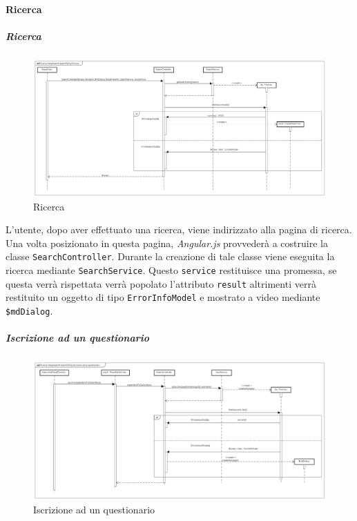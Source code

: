 \paragraph{Ricerca}

\subparagraph{Ricerca}

\label{Ricerca}

\begin{figure}[ht]
	\centering
	\includegraphics[scale=0.275,keepaspectratio]{UML/DiagrammiDiSequenza/Front-end/Search.png}
	\caption{Ricerca}
\end{figure} \FloatBarrier

L'utente, dopo aver effettuato una ricerca, viene indirizzato alla pagina di ricerca. Una volta posizionato in questa pagina, \textit{Angular.js} provvederà a costruire la classe \texttt{SearchController}. Durante la creazione di tale classe viene eseguita la ricerca mediante \texttt{SearchService}. Questo \texttt{service} restituisce una promessa, se questa verrà rispettata verrà popolato l'attributo \texttt{result} altrimenti verrà restituito un oggetto di tipo \texttt{ErrorInfoModel} e mostrato a video mediante \texttt{\$mdDialog}.

\subparagraph{Iscrizione ad un questionario}

\label{Iscrizione ad un questionario}

\begin{figure}[ht]
	\centering
	\includegraphics[scale=0.275,keepaspectratio]{UML/DiagrammiDiSequenza/Front-end/Search_subscribeToQuiz.png}
	\caption{Iscrizione ad un questionario}
\end{figure} \FloatBarrier

